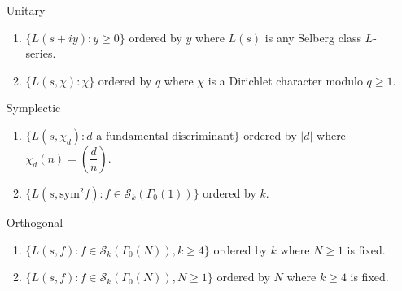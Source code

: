\documentclass[12pt]{book}
\theoremstyle{definition}\newframedtheorem{method}{Method}
\newcommand{\legendre}[2]{\genfrac{(}{)}{0.5pt}{0}{#1}{#2}}
\newcommand{\mc}{\mathcal}
\newcommand{\G}{\Gamma}
\newcommand{\<}{\langle}
\renewcommand{\>}{\rangle}
\begin{document}
        \begin{itemize}
          \item[Unitary]
            \begin{enumerate}[label=(\roman*)]
              \item $\{L(s+iy):y \ge 0\}$ ordered by $y$ where $L(s)$ is any Selberg class $L$-series.
              \item $\{L(s,\chi):\chi\}$ ordered by $q$ where $\chi$ is a Dirichlet character modulo $q \ge 1$.
            \end{enumerate}
          \item[Symplectic]
            \begin{enumerate}[label=(\roman*)]
              \item $\{L(s,\chi_{d}):\text{$d$ a fundamental discriminant}\}$ ordered by $|d|$ where $\chi_{d}(n) = \legendre{d}{n}$.
              \item $\{L(s,\mathrm{sym}^{2}f):f \in \mc{S}_{k}(\G_{0}(1))\}$ ordered by $k$.
            \end{enumerate}
          \item[Orthogonal]
            \begin{enumerate}[label=(\roman*)]
              \item $\{L(s,f):f \in \mc{S}_{k}(\G_{0}(N)), k \ge 4\}$ ordered by $k$ where $N \ge 1$ is fixed.
              \item $\{L(s,f):f \in \mc{S}_{k}(\G_{0}(N)), N \ge 1\}$ ordered by $N$ where $k \ge 4$ is fixed.
            \end{enumerate}
        \end{itemize}

\begin{appendix}

\end{appendix}

\printindex


\end{document}
